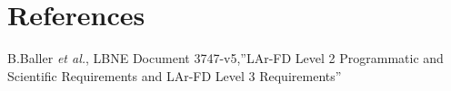 
\section{References}

\begin{thebibliography}{99}

 B.Baller {\it et al.}, LBNE Document 3747-v5,''LAr-FD Level 2 Programmatic and
Scientific Requirements and LAr-FD Level 3 Requirements''

	               
\end{thebibliography} 